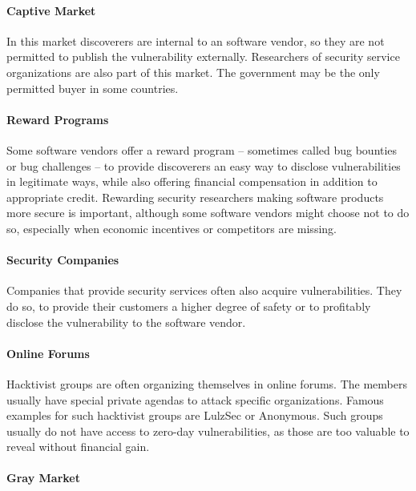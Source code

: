 \paragraph{Captive Market}

In this market discoverers are internal to an software vendor, so they are not
permitted to publish the vulnerability externally. 
Researchers of security service organizations are also part of this market.
The government may be the only permitted buyer in some countries.

\paragraph{Reward Programs}

Some software vendors offer a reward program -- sometimes called bug bounties or
bug challenges -- to provide discoverers an easy way to disclose vulnerabilities 
in legitimate ways, while also offering financial compensation in addition to 
appropriate credit.
Rewarding security researchers making software products more secure is 
important, although some software vendors might choose not to do so, especially when 
economic incentives or competitors are missing.

\paragraph{Security Companies}

Companies that provide security services often also acquire vulnerabilities.
They do so, to provide their customers a higher degree of safety or to 
profitably disclose the vulnerability to the software vendor.

\paragraph{Online Forums}

Hacktivist groups are often organizing themselves in online forums. 
The members usually have special private agendas to attack specific 
organizations.
Famous examples for such hacktivist groups are LulzSec or Anonymous.
Such groups usually do not have access to zero-day vulnerabilities, as those
are too valuable to reveal without financial gain.

\paragraph{Gray Market}

